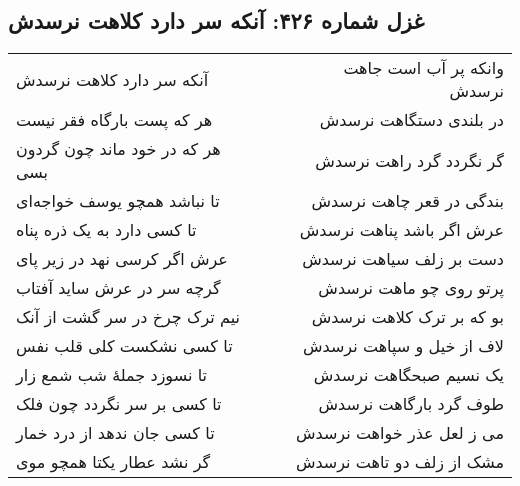 \begin{center}
\section*{غزل شماره ۴۲۶: آنکه سر دارد کلاهت نرسدش}
\label{sec:426}
\begin{longtable}{l p{0.5cm} r}
آنکه سر دارد کلاهت نرسدش
&&
وانکه پر آب است جاهت نرسدش
\\
هر که پست بارگاه فقر نیست
&&
در بلندی دستگاهت نرسدش
\\
هر که در خود ماند چون گردون بسی
&&
گر نگردد گرد راهت نرسدش
\\
تا نباشد همچو یوسف خواجه‌ای
&&
بندگی در قعر چاهت نرسدش
\\
تا کسی دارد به یک ذره پناه
&&
عرش اگر باشد پناهت نرسدش
\\
عرش اگر کرسی نهد در زیر پای
&&
دست بر زلف سیاهت نرسدش
\\
گرچه سر در عرش ساید آفتاب
&&
پرتو روی چو ماهت نرسدش
\\
نیم ترک چرخ در سر گشت از آنک
&&
بو که بر ترک کلاهت نرسدش
\\
تا کسی نشکست کلی قلب نفس
&&
لاف از خیل و سپاهت نرسدش
\\
تا نسوزد جملهٔ شب شمع زار
&&
یک نسیم صبحگاهت نرسدش
\\
تا کسی بر سر نگردد چون فلک
&&
طوف گرد بارگاهت نرسدش
\\
تا کسی جان ندهد از درد خمار
&&
می ز لعل عذر خواهت نرسدش
\\
گر نشد عطار یکتا همچو موی
&&
مشک از زلف دو تاهت نرسدش
\\
\end{longtable}
\end{center}
